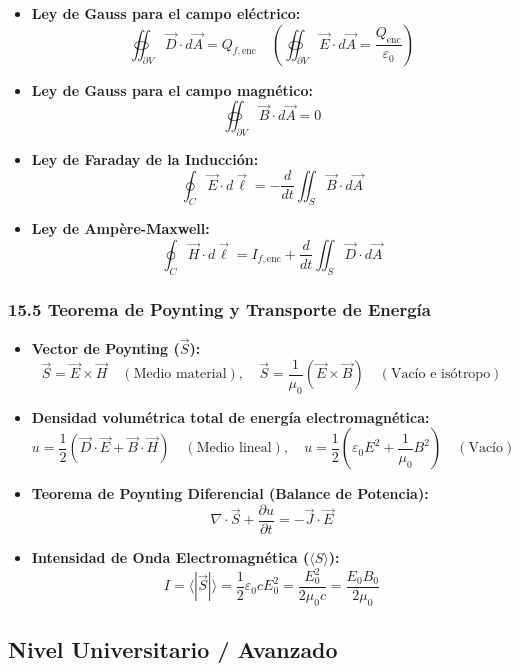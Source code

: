 \documentclass[11pt,a4paper]{article}
\begin{document}
\begin{itemize}
  \item \textbf{Ley de Gauss para el campo eléctrico:}
  \[
    \oiint_{\partial V} \vec{D} \cdot d\vec{A} = Q_{f,\text{enc}} \quad \left( \oiint_{\partial V} \vec{E} \cdot d\vec{A} = \frac{Q_{\text{enc}}}{\varepsilon_0} \right)
  \]
  \item \textbf{Ley de Gauss para el campo magnético:}
  \[
    \oiint_{\partial V} \vec{B} \cdot d\vec{A} = 0
  \]
  \item \textbf{Ley de Faraday de la Inducción:}
  \[
    \oint_C \vec{E} \cdot d\vec{\ell} = -\frac{d}{dt} \iint_S \vec{B} \cdot d\vec{A}
  \]
  \item \textbf{Ley de Ampère-Maxwell:}
  \[
    \oint_C \vec{H} \cdot d\vec{\ell} = I_{f,\text{enc}} + \frac{d}{dt} \iint_S \vec{D} \cdot d\vec{A}
  \]
\end{itemize}

\subsubsection*{15.5 Teorema de Poynting y Transporte de Energía}

\begin{itemize}
  \item \textbf{Vector de Poynting ($\vec{S}$):}
  \[
    \vec{S} = \vec{E} \times \vec{H} \quad (\text{Medio material}), \quad \vec{S} = \frac{1}{\mu_0}(\vec{E} \times \vec{B}) \quad (\text{Vacío e isótropo})
  \]
  \item \textbf{Densidad volumétrica total de energía electromagnética:}
  \[
    u = \frac{1}{2} (\vec{D} \cdot \vec{E} + \vec{B} \cdot \vec{H}) \quad (\text{Medio lineal}), \quad u = \frac{1}{2} \left( \varepsilon_0 E^2 + \frac{1}{\mu_0} B^2 \right) \quad (\text{Vacío})
  \]
  \item \textbf{Teorema de Poynting Diferencial (Balance de Potencia):}
  \[
    \nabla \cdot \vec{S} + \frac{\partial u}{\partial t} = -\vec{J} \cdot \vec{E}
  \]
  \item \textbf{Intensidad de Onda Electromagnética ($\langle S \rangle$):}
  \[
    I = \langle |\vec{S}| \rangle = \frac{1}{2} \varepsilon_0 c E_0^2 = \frac{E_0^2}{2 \mu_0 c} = \frac{E_0 B_0}{2\mu_0}
  \]
\end{itemize}

\subsection*{Nivel Universitario / Avanzado}
\end{document}
